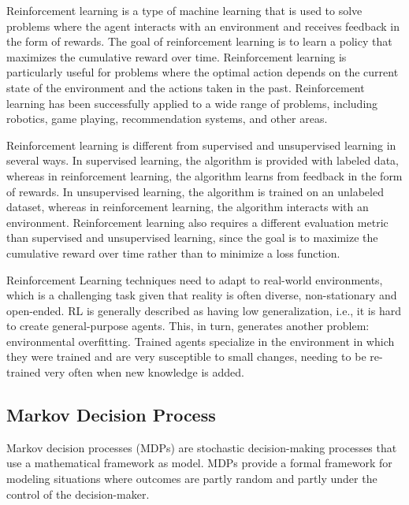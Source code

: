Reinforcement learning is a type of machine learning that is used to solve problems where the agent interacts with an environment and receives feedback in the form of rewards. The goal of reinforcement learning is to learn a policy that maximizes the cumulative reward over time. Reinforcement learning is particularly useful for problems where the optimal action depends on the current state of the environment and the actions taken in the past. Reinforcement learning has been successfully applied to a wide range of problems, including robotics\cite{lindner2021positioning, franceschetti2021robotic, kober2013reinforcement}, game playing\cite{silver2017mastering, vinyals2019grandmaster, silver2016mastering}, recommendation systems\cite{afsar2022reinforcement, xin2020self, rojanavasu2005new, tang2019reinforcement}, and other areas.

Reinforcement learning is different from supervised and unsupervised learning in several ways. In supervised learning, the algorithm is provided with labeled data, whereas in reinforcement learning, the algorithm learns from feedback in the form of rewards. In unsupervised learning, the algorithm is trained on an unlabeled dataset, whereas in reinforcement learning, the algorithm interacts with an environment. Reinforcement learning also requires a different evaluation metric than supervised and unsupervised learning, since the goal is to maximize the cumulative reward over time rather than to minimize a loss function.

Reinforcement Learning techniques need to adapt to real-world environments, which is a challenging task given that reality is often diverse, non-stationary and open-ended. RL is generally described as having low generalization, i.e., it is hard to create general-purpose agents. This, in turn, generates another problem: environmental overfitting. Trained agents specialize in the environment in which they were trained and are very susceptible to small changes, needing to be re-trained very often when new knowledge is added\cite{such218Atari, yang2018Learning}.

\subsection*{Markov Decision Process}
Markov decision processes (MDPs) are stochastic decision-making processes that use a mathematical framework as model. MDPs provide a formal framework for modeling situations where outcomes are partly random and partly under the control of the decision-maker. 

